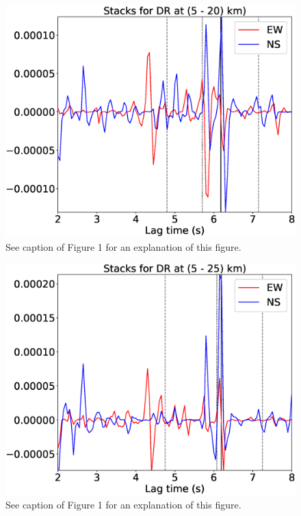 \documentclass[letterpaper, 12pt]{article}
\begin{document}
\begin{figure}[H]
\includegraphics[width=\linewidth]{figures/intervals/DR_005_020_stacks.eps}
\caption{See caption of Figure 1 for an explanation of this figure.}
\end{figure}

\begin{figure}[H]
\includegraphics[width=\linewidth]{figures/intervals/DR_005_025_stacks.eps}
\caption{See caption of Figure 1 for an explanation of this figure.}
\end{figure}
\end{document}
